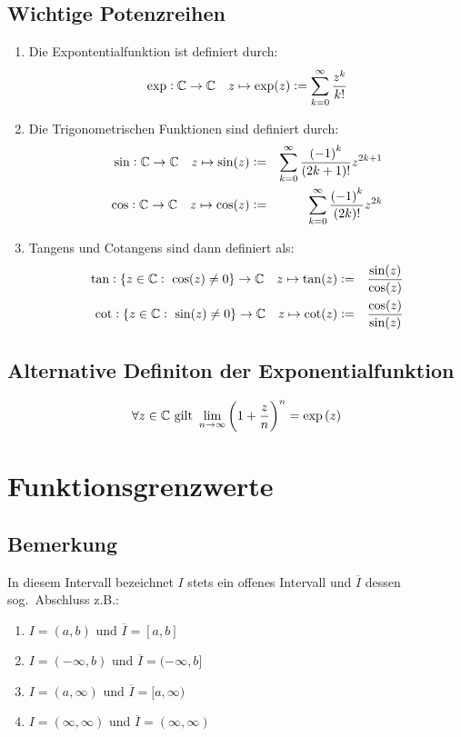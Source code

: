 \subsection{Wichtige Potenzreihen}
\begin{enumerate}[label= (\alph*)]
    \item Die Expontentialfunktion ist definiert durch:
        \begin{equation*}
            \exp: \mathbb{C} \rightarrow \mathbb{C}\quad z \mapsto \exp(z) :=
            \sum_{k=0}^\infty \frac{z^k}{k!}
        \end{equation*}
    \item Die Trigonometrischen Funktionen sind definiert durch:
        \begin{eqnarray*}
            \sin: \mathbb{C} \rightarrow \mathbb{C}\quad z \mapsto \sin(z) &:=&
            \sum_{k=0}^\infty \frac{{(-1)}^k}{(2k+1)!}z^{2k+1}\\
            \cos: \mathbb{C} \rightarrow \mathbb{C}\quad z \mapsto \cos(z) &:=&
            \sum_{k=0}^\infty \frac{{(-1)}^k}{(2k)!}z^{2k}
        \end{eqnarray*}
    \item Tangens und Cotangens sind dann definiert als:
        \begin{eqnarray*}
            \tan: \{z \in \mathbb{C}:\ \cos(z) \neq 0 \} \rightarrow \mathbb{C}\quad
            z \mapsto \tan(z)&:=&\frac{\sin(z)}{\cos(z)}\\
            \cot: \{z \in \mathbb{C}:\ \sin(z) \neq 0 \} \rightarrow \mathbb{C}\quad
            z \mapsto \cot(z)&:=&\frac{\cos(z)}{\sin(z)}
        \end{eqnarray*}
\end{enumerate}

\subsection{Alternative Definiton der Exponentialfunktion}
\begin{equation*}
    \forall z \in \mathbb{C} \text{ gilt }
    \lim_{n \rightarrow \infty} {\left(1 + \frac{z}{n}\right)}^n = \exp{(z)}
\end{equation*}

\section{Funktionsgrenzwerte}

\subsection{Bemerkung}
In diesem Intervall bezeichnet $I$ stets ein offenes Intervall und
$\overline{I}$ dessen sog.\ Abschluss z.B.:
\begin{enumerate}[label= (\alph*)]
    \item $I = (a, b)$ und $\overline{I} = [a, b]$
    \item $I = (-\infty, b)$ und $\overline{I} = (-\infty, b]$
    \item $I = (a, \infty)$ und $\overline{I} = [a, \infty)$
    \item $I = (\infty, \infty)$ und $\overline{I} = (\infty, \infty)$
\end{enumerate}

